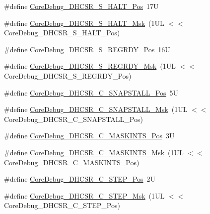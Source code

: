 \begin{DoxyCompactItemize}
\item 
\#define \mbox{\hyperlink{group___c_m_s_i_s___core_debug_ga760a9a0d7f39951dc3f07d01f1f64772}{Core\+Debug\+\_\+\+D\+H\+C\+S\+R\+\_\+\+S\+\_\+\+H\+A\+L\+T\+\_\+\+Pos}}~17U
\item 
\#define \mbox{\hyperlink{group___c_m_s_i_s___core_debug_ga9f881ade3151a73bc5b02b73fe6473ca}{Core\+Debug\+\_\+\+D\+H\+C\+S\+R\+\_\+\+S\+\_\+\+H\+A\+L\+T\+\_\+\+Msk}}~(1\+U\+L $<$$<$ Core\+Debug\+\_\+\+D\+H\+C\+S\+R\+\_\+\+S\+\_\+\+H\+A\+L\+T\+\_\+\+Pos)
\item 
\#define \mbox{\hyperlink{group___c_m_s_i_s___core_debug_ga20a71871ca8768019c51168c70c3f41d}{Core\+Debug\+\_\+\+D\+H\+C\+S\+R\+\_\+\+S\+\_\+\+R\+E\+G\+R\+D\+Y\+\_\+\+Pos}}~16U
\item 
\#define \mbox{\hyperlink{group___c_m_s_i_s___core_debug_gac4cd6f3178de48f473d8903e8c847c07}{Core\+Debug\+\_\+\+D\+H\+C\+S\+R\+\_\+\+S\+\_\+\+R\+E\+G\+R\+D\+Y\+\_\+\+Msk}}~(1\+U\+L $<$$<$ Core\+Debug\+\_\+\+D\+H\+C\+S\+R\+\_\+\+S\+\_\+\+R\+E\+G\+R\+D\+Y\+\_\+\+Pos)
\item 
\#define \mbox{\hyperlink{group___c_m_s_i_s___core_debug_ga85747214e2656df6b05ec72e4d22bd6d}{Core\+Debug\+\_\+\+D\+H\+C\+S\+R\+\_\+\+C\+\_\+\+S\+N\+A\+P\+S\+T\+A\+L\+L\+\_\+\+Pos}}~5U
\item 
\#define \mbox{\hyperlink{group___c_m_s_i_s___core_debug_ga53aa99b2e39a67622f3b9973e079c2b4}{Core\+Debug\+\_\+\+D\+H\+C\+S\+R\+\_\+\+C\+\_\+\+S\+N\+A\+P\+S\+T\+A\+L\+L\+\_\+\+Msk}}~(1\+U\+L $<$$<$ Core\+Debug\+\_\+\+D\+H\+C\+S\+R\+\_\+\+C\+\_\+\+S\+N\+A\+P\+S\+T\+A\+L\+L\+\_\+\+Pos)
\item 
\#define \mbox{\hyperlink{group___c_m_s_i_s___core_debug_ga0d2907400eb948a4ea3886ca083ec8e3}{Core\+Debug\+\_\+\+D\+H\+C\+S\+R\+\_\+\+C\+\_\+\+M\+A\+S\+K\+I\+N\+T\+S\+\_\+\+Pos}}~3U
\item 
\#define \mbox{\hyperlink{group___c_m_s_i_s___core_debug_ga77fe1ef3c4a729c1c82fb62a94a51c31}{Core\+Debug\+\_\+\+D\+H\+C\+S\+R\+\_\+\+C\+\_\+\+M\+A\+S\+K\+I\+N\+T\+S\+\_\+\+Msk}}~(1\+U\+L $<$$<$ Core\+Debug\+\_\+\+D\+H\+C\+S\+R\+\_\+\+C\+\_\+\+M\+A\+S\+K\+I\+N\+T\+S\+\_\+\+Pos)
\item 
\#define \mbox{\hyperlink{group___c_m_s_i_s___core_debug_gae1fc39e80de54c0339cbb1b298a9f0f9}{Core\+Debug\+\_\+\+D\+H\+C\+S\+R\+\_\+\+C\+\_\+\+S\+T\+E\+P\+\_\+\+Pos}}~2U
\item 
\#define \mbox{\hyperlink{group___c_m_s_i_s___core_debug_gae6bda72fbd32cc5734ff3542170dc00d}{Core\+Debug\+\_\+\+D\+H\+C\+S\+R\+\_\+\+C\+\_\+\+S\+T\+E\+P\+\_\+\+Msk}}~(1\+U\+L $<$$<$ Core\+Debug\+\_\+\+D\+H\+C\+S\+R\+\_\+\+C\+\_\+\+S\+T\+E\+P\+\_\+\+Pos)
$$
\end{DoxyCompactItemize}

